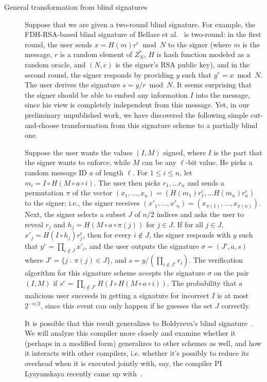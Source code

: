 \begin{description}
\item[General transformation from blind signatures] Suppose that we are given a two-round blind signature.  For example, the FDH-RSA-based blind signature of Bellare et al.~\cite{JC:BNPS03} is two-round: in the first round, the user sends $x=H(m)r^e \bmod N$ to the signer (where $m$ is the message, $r$ is a random element of $Z_N^*$, $H$ is hash function modeled as a random oracle, and $(N,e)$ is the signer's RSA public key), and in the second round, the signer responds by providing $y$ such that $y^e=x\bmod N$.  The user derives the signature $s = y/r \bmod N$.  It seems surprising that the signer should be able to embed any information $I$ into the message, since his view is completely independent from this message.  Yet, in our preliminary unpublished work, we have discovered the following simple cut-and-choose transformation from this signature scheme to a partially blind one.  

Suppose the user wants the values $(I,M)$ signed, where $I$ is the part that the signer wants to enforce, while $M$ can be any $\ell$-bit value.  
He picks a random message ID $a$ of length $\ell$.  
For $1\leq i \leq n$, let $m_i = I \circ H(M\circ a \circ i)$.  
The user then picks $r_1,\ldots r_n$ and sends a permutation $\pi$ of the vector $(x_1,\ldots,x_n) = (H(m_1)r_1^e,\ldots H(m_n)r_n^e)$ to the signer; 
i.e., the signer receives $(x'_1,\ldots,x'_n)=(x_{\pi(1)},\ldots,x_{\pi(n)})$.  Next, the signer selects a subset $J$ of $n/2$ indices and asks the user to reveal $r_j$ and $h_j = H(M\circ a \circ \pi(j))$ for $j\in J$.  If for all $j \in J$, $x'_j = H(I \circ h_j)r_j^e$, then for every $i \notin J$, the signer responds with $y$ such that $y^e = \prod_{i\notin J} x'_i$, and the user outputs the signature $\sigma = (J',a,s)$ where $J' = \{j~:~\pi(j)\in J\}$, and $s = y/(\prod_{i \notin J'}r_i)$.  The verification algorithm for this signature scheme accepts the signature $\sigma$ on the pair $(I,M)$ if $s^e = \prod_{i \notin J'} H(I \circ H(M\circ a \circ i))$.  The probability that a malicious user succeeds in getting a signature for incorrect $I$ is at most $2^{-n/2}$, since this event can only happen if he guesses the set $J$ correctly.  

It is possible that this result generalizes to Boldyreva's blind signature~\cite{PKC:Boldyreva03}.  We will analyze this compiler more closely and examine whether it (perhaps in a modified form) generalizes to other schemes as well, and how it interacts with other compilers, i.e. whether it's possibly to reduce its overhead when it is executed jointly with, say, the compiler PI Lysyanskaya recently came up with~\cite{chllw22}.


\end{description}
